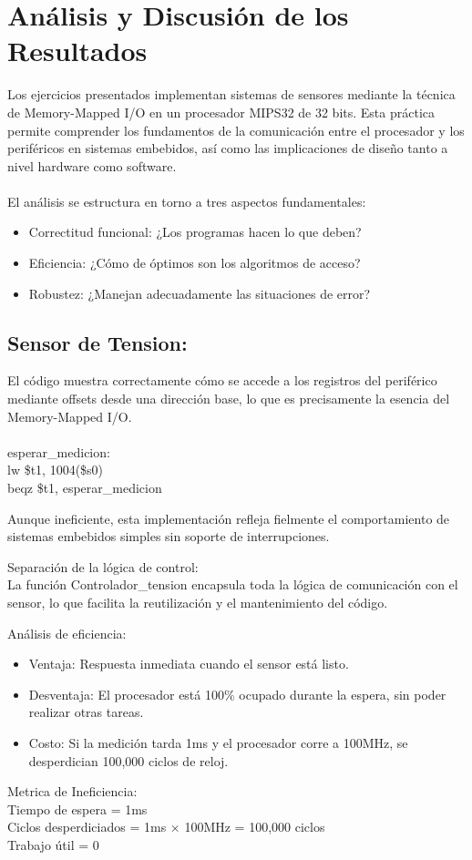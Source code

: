\documentclass{article}
\begin{document}
\section{Análisis y Discusión de los Resultados}
Los ejercicios presentados implementan sistemas de sensores mediante la técnica de Memory-Mapped I/O en un procesador MIPS32 de 32 bits. Esta práctica permite comprender los fundamentos de la comunicación entre el procesador y los periféricos en sistemas embebidos, así como las implicaciones de diseño tanto a nivel hardware como software.
\\
\\
El análisis se estructura en torno a tres aspectos fundamentales:
\begin{itemize}
    \item Correctitud funcional: ¿Los programas hacen lo que deben?
    \item Eficiencia: ¿Cómo de óptimos son los algoritmos de acceso?
    \item Robustez: ¿Manejan adecuadamente las situaciones de error?
\end{itemize} 
\subsection{Sensor de Tension:}
El código muestra correctamente cómo se accede a los registros del periférico mediante offsets desde una dirección base, lo que es precisamente la esencia del Memory-Mapped I/O.
\\
\\
esperar\_medicion:
\\
    lw \$t1, 1004(\$s0)
    \\
    beqz \$t1, esperar\_medicion

Aunque ineficiente, esta implementación refleja fielmente el comportamiento de sistemas embebidos simples sin soporte de interrupciones.

Separación de la lógica de control:
\\
La función Controlador\_tension encapsula toda la lógica de comunicación con el sensor, lo que facilita la reutilización y el mantenimiento del código.

Análisis de eficiencia:
\begin{itemize}
    \item Ventaja: Respuesta inmediata cuando el sensor está listo.

    \item Desventaja: El procesador está 100\% ocupado durante la espera, sin poder realizar otras tareas.

    \item Costo: Si la medición tarda 1ms y el procesador corre a 100MHz, se desperdician 100,000 ciclos de reloj.
    
\end{itemize}
Metrica de Ineficiencia:
\\
Tiempo de espera = 1ms\\
Ciclos desperdiciados = 1ms × 100MHz = 100,000 ciclos\\
Trabajo útil = 0%
\end{document}
